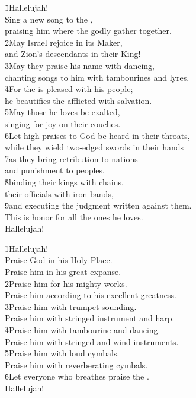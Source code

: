 \begin{poetry}
\poeml \v{1}Hallelujah! \\
\poemll    Sing a new song to the , \\
\poemlll       praising him where the godly gather together. \\
\poeml \v{2}May Israel rejoice in its Maker, \\
\poemll    and Zion's descendants in their King! \\
\poeml \v{3}May they praise his name with dancing, \\
\poemll    chanting songs to him with tambourines and lyres. \\
\poeml \v{4}For the  is pleased with his people; \\
\poemll    he beautifies the afflicted with salvation. \\
\poeml \v{5}May those he loves be exalted, \\
\poemll    singing for joy on their couches. \\
\poeml \v{6}Let high praises to God be heard in their throats, \\
\poemll    while they wield two-edged swords in their hands \\
\poeml \v{7}as they bring retribution to nations \\
\poemll    and punishment to peoples, \\
\poeml \v{8}binding their kings with chains, \\
\poemll    their officials with iron bands, \\
\poeml \v{9}and executing the judgment written against them. \\
\poeml This is honor for all the ones he loves. \\
\poeml Hallelujah!
\end{poetry}

\begin{poetry}
\poeml \v{1}Hallelujah! \\
\poeml Praise God in his Holy Place. \\
\poemll    Praise him in his great expanse. \\
\poeml \v{2}Praise him for his mighty works. \\
\poemll    Praise him according to his excellent greatness. \\
\poeml \v{3}Praise him with trumpet sounding. \\
\poemll    Praise him with stringed instrument and harp. \\
\poeml \v{4}Praise him with tambourine and dancing. \\
\poemll    Praise him with stringed and wind instruments. \\
\poeml \v{5}Praise him with loud cymbals. \\
\poemll    Praise him with reverberating cymbals. \\
\poeml \v{6}Let everyone who breathes praise the . \\
\poeml Hallelujah!
\end{poetry}
